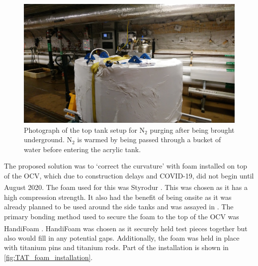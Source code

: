 \begin{figure}[]
\includegraphics[width=\textwidth]{Figures/Construction/tat_purging.JPG}
\centering
\caption{Photograph of the top tank setup for N$_2$ purging after being brought underground.
         N$_2$ is warmed by being passed through a bucket of water before entering the acrylic tank.}
\label{fig:TAT_purging}
\end{figure}

\par
The proposed solution was to `correct the curvature' with foam installed on top of the OCV, which due to construction delays and COVID-19, did not begin until August 2020.
The foam used for this was Styrodur\textsuperscript{\textregistered} \cite{styrodur_foam_ref}.
This was chosen as it has a high compression strength.
It also had the benefit of being onsite as it was already planned to be used around the side tanks and was assayed in \cite{LZ_assay_ref}. 
The primary bonding method used to secure the foam to the top of the OCV was HandiFoam\textsuperscript{\textregistered} \cite{handifoam_ref}.
HandiFoam\textsuperscript{\textregistered} was chosen as it securely held test pieces together but also would fill in any potential gaps.
Additionally, the foam was held in place with titanium pins and titanium rods.
Part of the installation is shown in \autoref{fig:TAT_foam_installation}.

